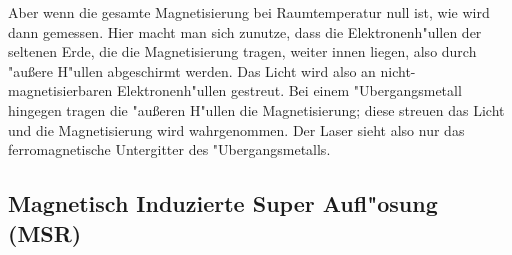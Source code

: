 Aber wenn die gesamte Magnetisierung bei Raumtemperatur null ist, wie wird dann gemessen.
Hier macht man sich zunutze, dass die Elektronenh"ullen der seltenen Erde, die die Magnetisierung tragen, weiter innen liegen, also durch "au{\ss}ere H"ullen abgeschirmt werden.
Das Licht wird also an nicht-magnetisierbaren Elektronenh"ullen gestreut.
Bei einem "Ubergangsmetall hingegen tragen die "au{\ss}eren H"ullen die Magnetisierung; diese streuen das Licht und die Magnetisierung wird wahrgenommen.
Der Laser sieht also nur das ferromagnetische Untergitter des "Ubergangsmetalls.
\cite{roll}

\subsection{Magnetisch Induzierte Super Aufl"osung (MSR)}
